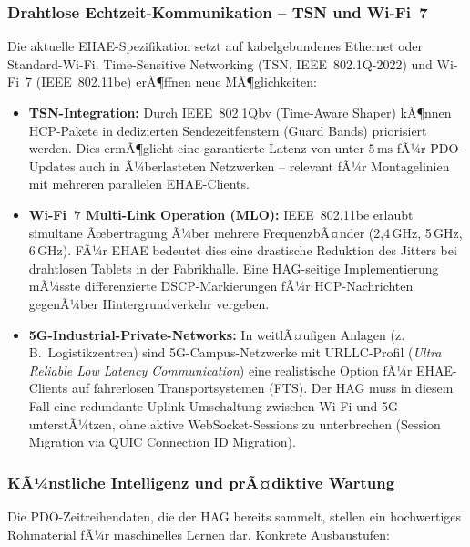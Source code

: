 ﻿\documentclass[12pt,a4paper]{article}
\begin{document}
\subsubsection*{Drahtlose Echtzeit-Kommunikation -- TSN und Wi-Fi~7}

Die aktuelle EHAE-Spezifikation setzt auf kabelgebundenes Ethernet oder Standard-Wi-Fi.
Time-Sensitive Networking (TSN, IEEE~802.1Q-2022) und Wi-Fi~7 (IEEE~802.11be) erÃ¶ffnen
neue MÃ¶glichkeiten:

\begin{itemize}[leftmargin=2em]
  \item \textbf{TSN-Integration:} Durch IEEE~802.1Qbv (Time-Aware Shaper) kÃ¶nnen
    HCP-Pakete in dedizierten Sendezeitfenstern (Guard Bands) priorisiert werden.
    Dies ermÃ¶glicht eine garantierte Latenz von unter $5\,\si{\milli\second}$ fÃ¼r
    PDO-Updates auch in Ã¼berlasteten Netzwerken -- relevant fÃ¼r
    Montagelinien mit mehreren parallelen EHAE-Clients.
  \item \textbf{Wi-Fi~7 Multi-Link Operation (MLO):} IEEE~802.11be erlaubt
    simultane Ãœbertragung Ã¼ber mehrere FrequenzbÃ¤nder (2,4\,GHz, 5\,GHz, 6\,GHz).
    FÃ¼r EHAE bedeutet dies eine drastische Reduktion des Jitters bei
    drahtlosen Tablets in der Fabrikhalle. Eine HAG-seitige Implementierung
    mÃ¼sste differenzierte DSCP-Markierungen fÃ¼r HCP-Nachrichten gegenÃ¼ber
    Hintergrundverkehr vergeben.
  \item \textbf{5G-Industrial-Private-Networks:} In weitlÃ¤ufigen Anlagen (z.\,B.\
    Logistikzentren) sind 5G-Campus-Netzwerke mit URLLC-Profil (\emph{Ultra
    Reliable Low Latency Communication}) eine realistische Option fÃ¼r
    EHAE-Clients auf fahrerlosen Transportsystemen (FTS). Der HAG muss in
    diesem Fall eine redundante Uplink-Umschaltung zwischen Wi-Fi und 5G
    unterstÃ¼tzen, ohne aktive WebSocket-Sessions zu unterbrechen (Session
    Migration via QUIC Connection ID Migration).
\end{itemize}

\subsubsection*{KÃ¼nstliche Intelligenz und prÃ¤diktive Wartung}

Die PDO-Zeitreihendaten, die der HAG bereits sammelt, stellen ein hochwertiges
Rohmaterial fÃ¼r maschinelles Lernen dar. Konkrete Ausbaustufen:
\end{document}
